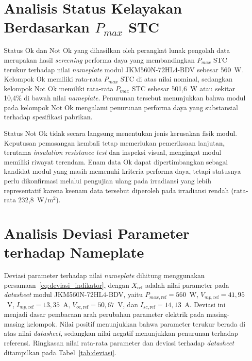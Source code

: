 \section{Analisis Status Kelayakan Berdasarkan \texorpdfstring{$P_{max}$}{Pmax} STC}

Status Ok dan Not Ok yang dihasilkan oleh perangkat lunak pengolah data
merupakan hasil \textit{screening} performa daya yang membandingkan $P_{max}$
STC terukur terhadap nilai \textit{nameplate} modul JKM560N-72HL4-BDV sebesar
560~W. Kelompok Ok memiliki rata-rata $P_{max}$ STC di atas nilai nominal,
sedangkan kelompok Not Ok memiliki rata-rata $P_{max}$ STC sebesar 501,6~W atau
sekitar 10,4\% di bawah nilai \textit{nameplate}. Penurunan tersebut
menunjukkan bahwa modul pada kelompok Not Ok mengalami penurunan performa daya
yang substansial terhadap spesifikasi pabrikan.

Status Not Ok tidak secara langsung menentukan jenis kerusakan fisik modul.
Keputusan pemasangan kembali tetap memerlukan pemeriksaan lanjutan, terutama
\textit{insulation resistance test} dan inspeksi visual, mengingat modul
memiliki riwayat terendam. Enam data Ok dapat dipertimbangkan sebagai kandidat
modul yang masih memenuhi kriteria performa daya, tetapi statusnya perlu
dikonfirmasi melalui pengujian ulang pada irradiansi yang lebih representatif
karena keenam data tersebut diperoleh pada irradiansi rendah (rata-rata
232,8~W/m$^2$).

\section{Analisis Deviasi Parameter terhadap Nameplate}

Deviasi parameter terhadap nilai \textit{nameplate} dihitung menggunakan
persamaan~\eqref{eq:deviasi_indikator}, dengan $X_{\text{ref}}$ adalah nilai
parameter pada \textit{datasheet} modul JKM560N-72HL4-BDV, yaitu
$P_{max,\text{ref}} = 560$~W, $V_{mp,\text{ref}} = 41{,}95$~V,
$I_{mp,\text{ref}} = 13{,}35$~A, $V_{oc,\text{ref}} = 50{,}67$~V, dan
$I_{sc,\text{ref}} = 14{,}13$~A. Deviasi ini menjadi dasar pembacaan arah
perubahan parameter elektrik pada masing-masing kelompok. Nilai positif
menunjukkan bahwa parameter terukur berada di atas nilai \textit{datasheet},
sedangkan nilai negatif menunjukkan penurunan terhadap referensi. Ringkasan
nilai rata-rata parameter dan deviasi terhadap \textit{datasheet} ditampilkan
pada Tabel~\ref{tab:deviasi}.

